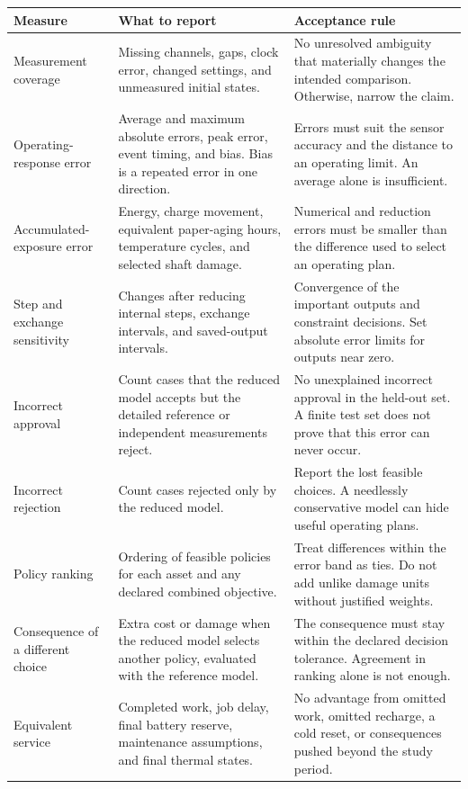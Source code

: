 \documentclass[11pt,a4paper]{report}
\begin{document}
\begin{longtable}{L{0.19\textwidth}L{0.34\textwidth}L{0.35\textwidth}}
\toprule Measure & What to report & Acceptance rule \\ \midrule\endhead
Measurement coverage & Missing channels, gaps, clock error, changed settings, and unmeasured initial states. & No unresolved ambiguity that materially changes the intended comparison. Otherwise, narrow the claim. \\
Operating-response error & Average and maximum absolute errors, peak error, event timing, and bias. Bias is a repeated error in one direction. & Errors must suit the sensor accuracy and the distance to an operating limit. An average alone is insufficient. \\
Accumulated-exposure error & Energy, charge movement, equivalent paper-aging hours, temperature cycles, and selected shaft damage. & Numerical and reduction errors must be smaller than the difference used to select an operating plan. \\
Step and exchange sensitivity & Changes after reducing internal steps, exchange intervals, and saved-output intervals. & Convergence of the important outputs and constraint decisions. Set absolute error limits for outputs near zero. \\
Incorrect approval & Count cases that the reduced model accepts but the detailed reference or independent measurements reject. & No unexplained incorrect approval in the held-out set. A finite test set does not prove that this error can never occur. \\
Incorrect rejection & Count cases rejected only by the reduced model. & Report the lost feasible choices. A needlessly conservative model can hide useful operating plans. \\
Policy ranking & Ordering of feasible policies for each asset and any declared combined objective. & Treat differences within the error band as ties. Do not add unlike damage units without justified weights. \\
Consequence of a different choice & Extra cost or damage when the reduced model selects another policy, evaluated with the reference model. & The consequence must stay within the declared decision tolerance. Agreement in ranking alone is not enough. \\
Equivalent service & Completed work, job delay, final battery reserve, maintenance assumptions, and final thermal states. & No advantage from omitted work, omitted recharge, a cold reset, or consequences pushed beyond the study period. \\

\end{longtable}
\end{document}

